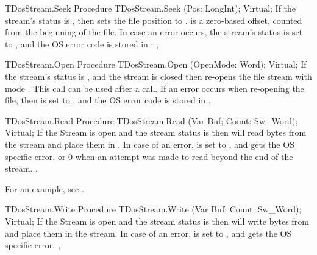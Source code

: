 \html{}

\begin{procedure}{TDosStream.Seek}
\Declaration
Procedure TDosStream.Seek (Pos: LongInt); Virtual;
\Description
If the stream's status is , then  sets the 
file position to .  is a zero-based offset, counted from
the beginning of the file.
\Errors
In case an error occurs, the stream's status is set to ,
and the OS error code is stored in .
\SeeAlso
{}, 
\end{procedure}

\html{}

\begin{procedure}{TDosStream.Open}
\Declaration
Procedure TDosStream.Open (OpenMode: Word); Virtual;
\Description
If the stream's status is , and the stream is closed then
 re-opens the file stream with mode .
This call can be used after a  call.
\Errors
If an error occurs when re-opening the file, then  is set
to , and the OS error code is stored in 
\SeeAlso
{}, 
\end{procedure}

\html{}

\begin{procedure}{TDosStream.Read}
\Declaration
Procedure TDosStream.Read (Var Buf; Count: Sw\_Word); Virtual;
\Description
If the Stream is open and the stream status is  then 
 will read  bytes from the stream and place them
in  .
\Errors
In case of an error,  is set to , and
 gets the OS specific error, or 0 when an attempt was
made to read beyond the end of the stream.
\SeeAlso
{}, 
\end{procedure}

For an example, see .

\begin{procedure}{TDosStream.Write}
\Declaration
Procedure TDosStream.Write (Var Buf; Count: Sw\_Word); Virtual;
\Description
If the Stream is open and the stream status is  then 
 will write  bytes from  and place them
in the stream.
\Errors
In case of an error,  is set to , and
 gets the OS specific error.
\SeeAlso
{}, 
\end{procedure}

